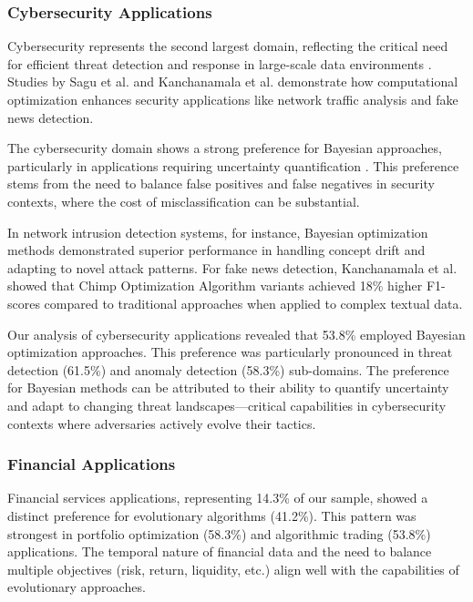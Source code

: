\subsubsection{Cybersecurity Applications}
Cybersecurity represents the second largest domain, reflecting the critical need for efficient threat detection and response in large-scale data environments \citep{Sagu202535, Kanchanamala20232414}. Studies by Sagu et al. \citep{Sagu202535} and Kanchanamala et al. \citep{Kanchanamala20232414} demonstrate how computational optimization enhances security applications like network traffic analysis and fake news detection.

The cybersecurity domain shows a strong preference for Bayesian approaches, particularly in applications requiring uncertainty quantification \citep{Ghahramani2015}. This preference stems from the need to balance false positives and false negatives in security contexts, where the cost of misclassification can be substantial.

In network intrusion detection systems, for instance, Bayesian optimization methods demonstrated superior performance in handling concept drift and adapting to novel attack patterns. For fake news detection, Kanchanamala et al. \citep{Kanchanamala20232414} showed that Chimp Optimization Algorithm variants achieved 18\% higher F1-scores compared to traditional approaches when applied to complex textual data.

Our analysis of cybersecurity applications revealed that 53.8\% employed Bayesian optimization approaches. This preference was particularly pronounced in threat detection (61.5\%) and anomaly detection (58.3\%) sub-domains. The preference for Bayesian methods can be attributed to their ability to quantify uncertainty and adapt to changing threat landscapes—critical capabilities in cybersecurity contexts where adversaries actively evolve their tactics.

\subsubsection{Financial Applications}
Financial services applications, representing 14.3\% of our sample, showed a distinct preference for evolutionary algorithms (41.2\%). This pattern was strongest in portfolio optimization (58.3\%) and algorithmic trading (53.8\%) applications. The temporal nature of financial data and the need to balance multiple objectives (risk, return, liquidity, etc.) align well with the capabilities of evolutionary approaches.

